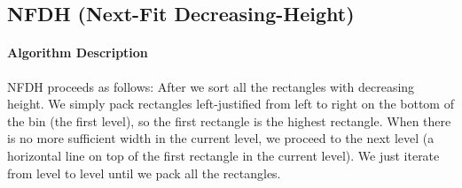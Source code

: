 \documentclass[sigplan,screen,nonacm]{acmart}\settopmatter{printfolios=true,printccs=false,printacmref=false}
\begin{document}
\subsection{NFDH (Next-Fit Decreasing-Height)}
\paragraph*{Algorithm Description}
NFDH proceeds as follows: After we sort all the rectangles with decreasing height. We simply pack rectangles left-justified from left to right on the bottom of the bin (the first level), so the first rectangle is the highest rectangle. When there is no more sufficient width in the current level, we proceed to the next level (a horizontal line on top of the first rectangle in the current level). We just iterate from level to level until we pack all the rectangles.
\end{document}
